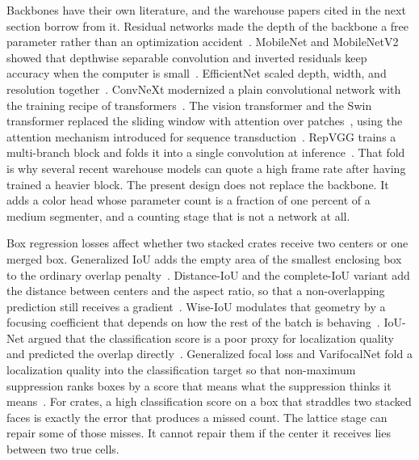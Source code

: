 Backbones have their own literature, and the warehouse papers cited in the next section borrow from it. Residual networks made the depth of the backbone a free parameter rather than an optimization accident~\cite{he2016resnet}. MobileNet and MobileNetV2 showed that depthwise separable convolution and inverted residuals keep accuracy when the computer is small~\cite{howard2017mobilenet,sandler2018mobilenetv2}. EfficientNet scaled depth, width, and resolution together~\cite{tan2019efficientnet}. ConvNeXt modernized a plain convolutional network with the training recipe of transformers~\cite{liu2022convnext}. The vision transformer and the Swin transformer replaced the sliding window with attention over patches~\cite{dosovitskiy2021vit,liu2021swin}, using the attention mechanism introduced for sequence transduction~\cite{vaswani2017attention}. RepVGG trains a multi-branch block and folds it into a single convolution at inference~\cite{ding2021repvgg}. That fold is why several recent warehouse models can quote a high frame rate after having trained a heavier block. The present design does not replace the backbone. It adds a color head whose parameter count is a fraction of one percent of a medium segmenter, and a counting stage that is not a network at all.

Box regression losses affect whether two stacked crates receive two centers or one merged box. Generalized IoU adds the empty area of the smallest enclosing box to the ordinary overlap penalty~\cite{rezatofighi2019giou}. Distance-IoU and the complete-IoU variant add the distance between centers and the aspect ratio, so that a non-overlapping prediction still receives a gradient~\cite{zheng2020diou}. Wise-IoU modulates that geometry by a focusing coefficient that depends on how the rest of the batch is behaving~\cite{tong2023wiou}. IoU-Net argued that the classification score is a poor proxy for localization quality and predicted the overlap directly~\cite{jiang2018iounet}. Generalized focal loss and VarifocalNet fold a localization quality into the classification target so that non-maximum suppression ranks boxes by a score that means what the suppression thinks it means~\cite{li2020gfl,zhang2021vfnet}. For crates, a high classification score on a box that straddles two stacked faces is exactly the error that produces a missed count. The lattice stage can repair some of those misses. It cannot repair them if the center it receives lies between two true cells.

